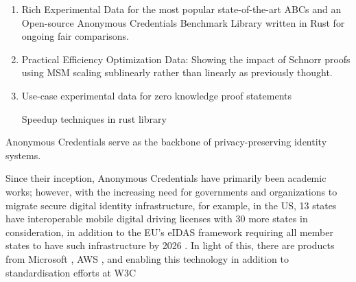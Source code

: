 \begin{enumerate}
    \item Rich Experimental Data for the most popular state-of-the-art ABCs and an Open-source Anonymous Credentials Benchmark Library written in Rust for ongoing fair comparisons. 

    \item Practical Efficiency Optimization Data: Showing the impact of Schnorr proofs using MSM scaling sublinearly rather than linearly as previously thought. 

    \item Use-case experimental data for zero knowledge proof statements

    Speedup techniques in rust library
    
\end{enumerate}








































Anonymous Credentials serve as the backbone of privacy-preserving identity systems. 

Since their inception, Anonymous Credentials have primarily been academic works; however, with the increasing need for governments and organizations to migrate secure digital identity infrastructure, for example, in the US, 13 states have interoperable mobile digital driving licenses \cite{aamva_jurisdiction_nodate} with 30 more states in consideration, in addition to the EU's eIDAS framework requiring all member states to have such infrastructure by 2026 \cite{european_parliament_meps_2024}. In light of this, there are products from Microsoft \cite{microsoft_microsoft_2025}, AWS \cite{aws_verifiable_nodate}, and \cite{dock_labs_dock_nodate} enabling this technology in addition to standardisation efforts at W3C \cite{w3c_verifiable_2025, w3c_decentralized_2022}


